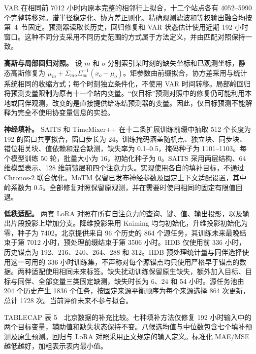 VAR 在相同前 7012 小时内原本完整的相邻行上拟合，十二个站点各有 4052--5990 个完整转移对。谱半径稳定化、协方差正则化、精确观测滤波和等权输出融合均按第~4~节固定。预测器读取长历史，回归修复和 VAR 状态估计使用近期 192 小时窗口。这种不同分支采用不同历史范围的方式属于方法定义，并由匹配对照保持一致。

\textbf{高斯与局部回归对照。}
设 $m$ 和 $o$ 分别索引某时刻的缺失坐标和已观测坐标，静态高斯修复为 $\mu_m+\Sigma_{mo}\Sigma_{oo}^{-1}(x_o-\mu_o)$。矩参数由前缀拟合，协方差采用与统计系统相同的收缩方式；每个时刻独立条件化，不使用 VAR 时间转移。局部岭回归将预测变量限制为原有十一个站内变量。“仅目标”预测对照中的修复仍可能利用本地或同伴观测，改变的是直接提供给冻结预测器的变量。因此，仅目标预测不能解释为完全不使用协变量信息的实验。

\textbf{神经填补。}
SAITS 和 TimeMixer++ 在十二条扩展训练前缀中抽取 512 个长度为 192 的窗口共享拟合，窗口步长为 24。训练掩码涵盖随机点、独立块、同步块、错位相关块、值依赖和混合缺测，缺失率为 0.1--0.5，掩码种子为 1101--1103。每个模型训练 50 轮，批量大小为 16，初始化种子为 0。SAITS 采用两层结构、64 维模型表示、128 维前馈层和四个注意力头。实现使用各自的填补目标，不通过 Chronos-2 联合优化。MoTM 保留已发布神经参数及固定上下文适配设置，其中岭系数为 0.5。全部修复对照保留原观测，并在需要时使用相同的固定有限值回退。

\textbf{低秩适配。}
两套 LoRA 对照在所有自注意力的查询、键、值、输出投影，以及输出片段投影上增加分支。降维投影采用 Kaiming 均匀初始化，升维投影初始化为零，种子为 7402。北京提供来自 96 个历史的 864 个源任务，其训练未来最晚结束于第 7012 小时，预处理前缀结束于第 3506 小时。HDB 仅使用前 336 小时，历史锚点为 192、216、240、264、288 和 312。HDB 预处理统计量与同伴选择使用这一可用的 336 小时训练集，不声称对每个源锚点均只使用严格早于锚点的数据。两种适配使用相同未来标签。缺失扰动训练保留原生缺失，额外加入目标、目标与同伴、全部变量三类固定缺测，缺失时长为 6、24 和 54 小时。源任务池由 204 个历史产生 1836 个任务，按固定来源平衡顺序为每个来源选择 864 次更新，总计 1728 次。当前评价未来不参与拟合。



TABLECAP 表 5　北京数据的补充比较。七种填补方法仅修复 192 小时输入中的两个目标变量，辅助值和缺失状态保持不变。八候选均值与中位数包含七个填补预测及原生预测。回归与 LoRA 对照采用正文规定的输入定义。标准化 MAE/MSE 越低越好，加粗表示表内最小值。

